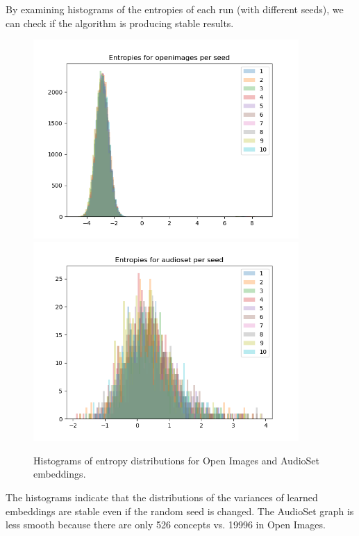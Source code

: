 By examining histograms of the entropies of each run (with different seeds), we can check if the algorithm is producing stable results. 
\begin{figure}[H]
    \centering
    \includegraphics[width=0.9\textwidth]{images/method/probabilistic_independent/openimages_entropies.png}
    \includegraphics[width=0.9\textwidth]{images/method/probabilistic_independent/audioset_entropies.png}
    \caption{
        Histograms of entropy distributions for Open Images and AudioSet embeddings. 
    }
\end{figure}
 
The histograms indicate that the distributions of the variances of learned embeddings are stable even if the random seed is changed. The AudioSet graph is less smooth because there are only 526 concepts vs. 19996 in Open Images. 
 
